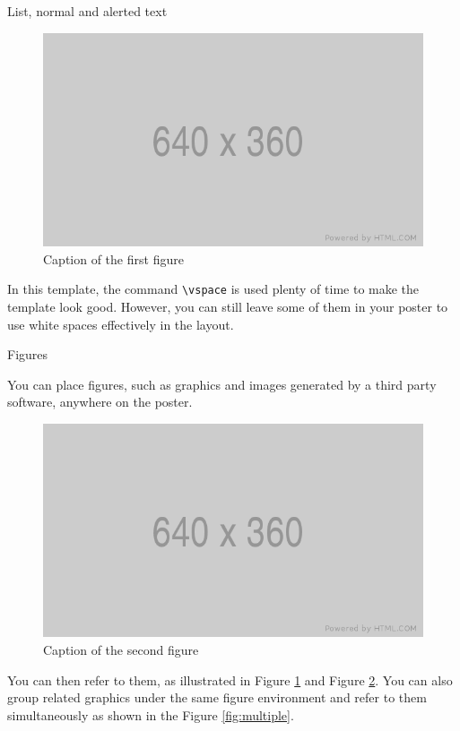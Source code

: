 \documentclass{beamer}
\newlength{\onecolwid}
\begin{document}
\begin{frame}[t, fragile]
\begin{columns}[t]
\begin{column}{\onecolwid}
\begin{block}{List, normal and alerted text}
	\vspace{0.5in}
	
	\begin{figure}
		\includegraphics[width=0.8\linewidth]{figure-files/placeholder.png}
		\caption{Caption of the first figure}
		\label{fig:1}
	\end{figure}
	
	In this template, the command \texttt{\textbackslash vspace} is used plenty of time to make the template look good. However, you can still leave some of them in your poster to use white spaces effectively in the layout.
	
\end{block}


\begin{block}{Figures}
	
	You can place figures, such as graphics and images generated by a third party software, anywhere on the poster.
	\vspace{0.5in}
	\begin{figure}
		\includegraphics[width=0.8\linewidth]{figure-files/placeholder.png}
		\caption{Caption of the second figure}
		\label{fig:2}
	\end{figure}
	You can then refer to them, as illustrated in Figure \ref{fig:1} and Figure \ref{fig:2}. You can also group related graphics under the same figure environment and refer to them simultaneously as shown in the Figure \ref{fig:multiple}.
	

\end{block}
\end{column}
\end{columns}
\end{frame}
\end{document}
